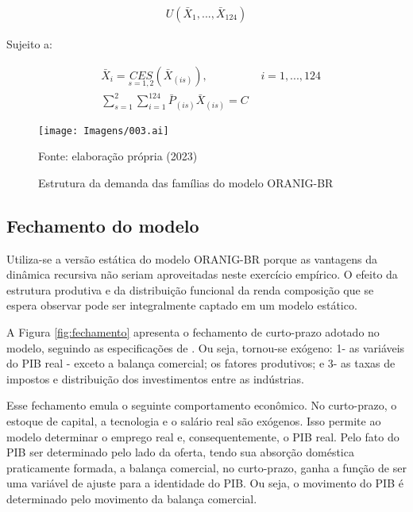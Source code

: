 \begin{align*}
	U(\bar{X}_1, ... , \bar{X}_{124})
\end{align*}

Sujeito a:

\begin{align}
	&\bar{X}_i = \underset{s = 1, 2}{CES} (\bar{X}_{(is)}), \hspace{2cm} i = 1, ... , 124 \\
	&\sum_{s = 1}^{2} \sum_{i = 1}^{124} \bar{P}_{(is)} \bar{X}_{(is)} = C
\end{align}

\begin{landscape}
	\begin{figure}
		\centering
		\texttt{[image: Imagens/003.ai]}
		\caption{Estrutura da demanda das famílias do modelo ORANIG-BR}
		\label{fig:estrutura_familia}
		\footnotesize
		Fonte: elaboração própria (2023)
	\end{figure}
\end{landscape}

\subsection{Fechamento do modelo} \label{subsec:fechamento}

Utiliza-se a versão estática do modelo ORANIG-BR porque as vantagens da dinâmica recursiva não seriam aproveitadas neste exercício empírico. O efeito da estrutura produtiva e da distribuição funcional da renda composição que se espera observar pode ser integralmente captado em um modelo estático.

A Figura \ref{fig:fechamento} apresenta o fechamento de curto-prazo adotado no modelo, seguindo as especificações de \textcite{horridge03}. Ou seja, tornou-se exógeno: 1- as variáveis do PIB real - exceto a balança comercial; os fatores produtivos; e 3- as taxas de impostos e distribuição dos investimentos entre as indústrias.

Esse fechamento emula o seguinte comportamento econômico. No curto-prazo, o estoque de capital, a tecnologia e o salário real são exógenos. Isso permite ao modelo determinar o emprego real e, consequentemente, o PIB real. Pelo fato do PIB ser determinado pelo lado da oferta, tendo sua absorção doméstica praticamente formada, a balança comercial, no curto-prazo, ganha a função de ser uma variável de ajuste para a identidade do PIB. Ou seja, o movimento do PIB é determinado pelo movimento da balança comercial.

